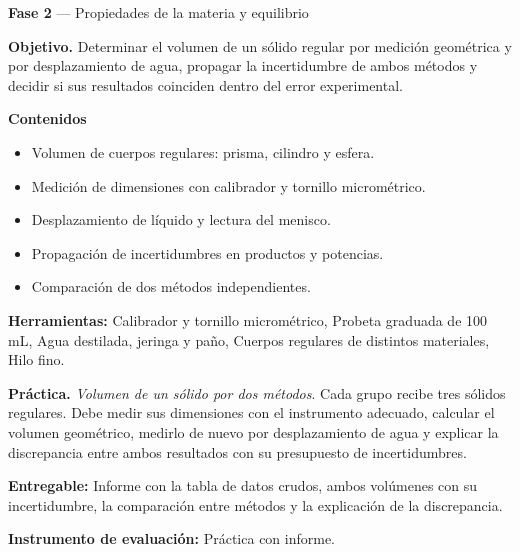 \documentclass[11pt,a4paper]{article}
\begin{document}
\begin{tcolorbox}[cajaContenido,title={Semana 5 --- Volumen de un sólido por dos métodos}]
\textbf{Fase 2} --- Propiedades de la materia y equilibrio

\textbf{Objetivo.} Determinar el volumen de un sólido regular por medición geométrica y por desplazamiento de agua, propagar la incertidumbre de ambos métodos y decidir si sus resultados coinciden dentro del error experimental.

\textbf{Contenidos}

\begin{itemize}[leftmargin=1.4em,itemsep=2pt,topsep=3pt]
  \item Volumen de cuerpos regulares: prisma, cilindro y esfera.
  \item Medición de dimensiones con calibrador y tornillo micrométrico.
  \item Desplazamiento de líquido y lectura del menisco.
  \item Propagación de incertidumbres en productos y potencias.
  \item Comparación de dos métodos independientes.
\end{itemize}

\textbf{Herramientas:} Calibrador y tornillo micrométrico, Probeta graduada de 100 mL, Agua destilada, jeringa y paño, Cuerpos regulares de distintos materiales, Hilo fino.

\textbf{Práctica.} \emph{Volumen de un sólido por dos métodos}. Cada grupo recibe tres sólidos regulares. Debe medir sus dimensiones con el instrumento adecuado, calcular el volumen geométrico, medirlo de nuevo por desplazamiento de agua y explicar la discrepancia entre ambos resultados con su presupuesto de incertidumbres.

\textbf{Entregable:} Informe con la tabla de datos crudos, ambos volúmenes con su incertidumbre, la comparación entre métodos y la explicación de la discrepancia.

\textbf{Instrumento de evaluación:} Práctica con informe.
\end{tcolorbox}
\end{document}
